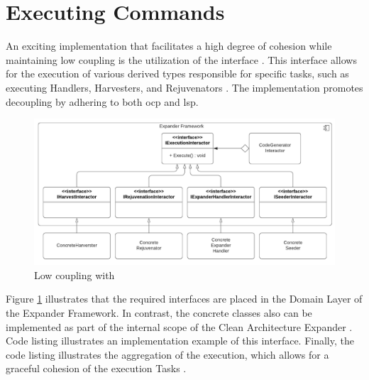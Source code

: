 \section{Executing Commands} \label{subsec_IExecutionInteractorObject}

An exciting implementation that facilitates a high degree of cohesion while maintaining
low coupling is the utilization of the  interface
\parencite{koks_iexecutioninteractor_2023}. This interface allows for the execution of
various derived types responsible for specific tasks, such as executing Handlers,
Harvesters, and Rejuvenators \parencites{koks_expandentitieshandlerinteractor_2023,
koks_regionharvesterinteractor_2023, koks_regionrejuvenatorinteractor_2023}. The
implementation promotes decoupling by adhering to both \gls{ocp} and \gls{lsp}.

\begin{figure}[H]
    \centering
    \includegraphics[width=1\textwidth]{figures/command_pattern.pdf}
    \caption[Low coupling with ]{Low coupling with }
    \label{fig_iexecutioninteractor}
  \end{figure}


Figure \ref{fig_iexecutioninteractor} illustrates that the required interfaces are placed
in the Domain Layer of the Expander Framework. In contrast, the concrete classes also can
be implemented as part of the internal scope of the Clean Architecture Expander
\parencite{koks_migrationharvesterinteractor_2023}. Code listing
 illustrates an implementation example of
this interface. Finally, the code listing 
illustrates the aggregation of the execution, which allows for a graceful cohesion of the
execution Tasks \parencite{koks_codegeneratorinteractor_2023}.

